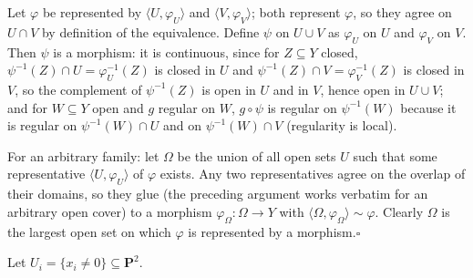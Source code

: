 \documentclass[11pt]{article}
\begin{document}
\pf
Let $\varphi$ be represented by $\langle U,\varphi_U\rangle$ and $\langle V,\varphi_V\rangle$; both represent $\varphi$, so they agree on $U\cap V$ by definition of the equivalence. Define $\psi$ on $U\cup V$ as $\varphi_U$ on $U$ and $\varphi_V$ on $V$. Then $\psi$ is a morphism: it is continuous, since for $Z\subseteq Y$ closed, $\psi^{-1}(Z)\cap U=\varphi_U^{-1}(Z)$ is closed in $U$ and $\psi^{-1}(Z)\cap V=\varphi_V^{-1}(Z)$ is closed in $V$, so the complement of $\psi^{-1}(Z)$ is open in $U$ and in $V$, hence open in $U\cup V$; and for $W\subseteq Y$ open and $g$ regular on $W$, $g\circ\psi$ is regular on $\psi^{-1}(W)$ because it is regular on $\psi^{-1}(W)\cap U$ and on $\psi^{-1}(W)\cap V$ (regularity is local).

For an arbitrary family: let $\Omega$ be the union of all open sets $U$ such that some representative $\langle U,\varphi_U\rangle$ of $\varphi$ exists. Any two representatives agree on the overlap of their domains, so they glue (the preceding argument works verbatim for an arbitrary open cover) to a morphism $\varphi_\Omega:\Omega\to Y$ with $\langle\Omega,\varphi_\Omega\rangle\sim\varphi$. Clearly $\Omega$ is the largest open set on which $\varphi$ is represented by a morphism.\hfill$\square$

\pf
Let $U_i=\{x_i\ne0\}\subseteq\mathbf P^2$.
\end{document}
